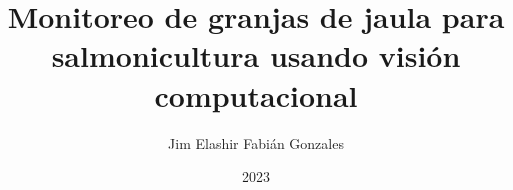 \documentclass[a4paper,12pt,oneside]{tesisutec}
\begin{document}
\frontmatter

\department{}

\title{Monitoreo de granjas de jaula para salmonicultura usando visión computacional}

\author{Jim Elashir Fabián Gonzales } %

\date{2023}

\maketitle



% 
% 

\tableofcontents

\newpage


\newpage



\mainmatter
\pagestyle{fancy}

% 
%  


% 
% 
% 
% 

\renewcommand{\bibname}{\hfill\Large\bf{REFERENCIAS BIBLIOGRÁFICAS}\hfill}




\end{document}
